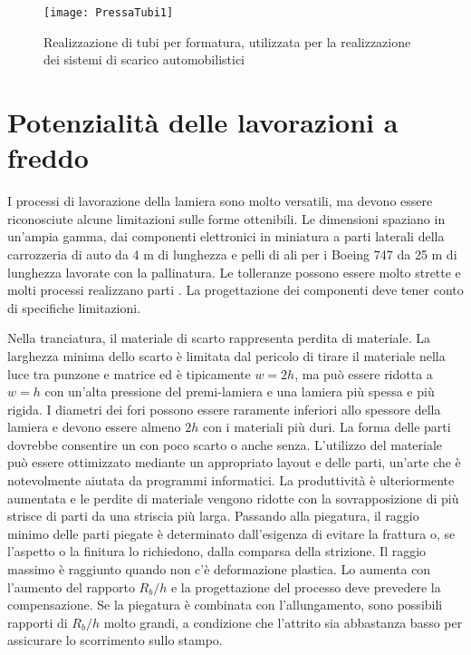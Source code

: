 \begin{figure}
\centering
\texttt{[image: PressaTubi1]}
\caption{Realizzazione di tubi per formatura, utilizzata per la realizzazione dei sistemi di scarico automobilistici}
\label{fig:PressaTubi1}
\end{figure}


\section{Potenzialità delle lavorazioni a freddo}
I processi di lavorazione della lamiera sono molto versatili, ma devono essere riconosciute alcune limitazioni sulle forme ottenibili.
Le dimensioni spaziano in un'ampia gamma, dai componenti elettronici in miniatura a parti laterali della carrozzeria di auto da 4 m di lunghezza e pelli di ali per i Boeing 747 da 25 m di lunghezza lavorate con la pallinatura.
Le tolleranze possono essere molto strette e molti processi realizzano parti .
La progettazione dei componenti deve tener conto di specifiche limitazioni.

Nella tranciatura, il materiale di scarto rappresenta perdita di materiale. La larghezza minima
dello scarto è limitata dal pericolo di tirare il materiale nella luce tra punzone e matrice ed è
tipicamente $w = 2h$, ma può essere ridotta a $w = h$ con un'alta pressione del premi-lamiera e
una lamiera più spessa e più rigida.
I diametri dei fori possono essere raramente inferiori allo spessore della lamiera e devono
essere almeno $2h$ con i materiali più duri. La forma delle parti dovrebbe consentire un
 con poco scarto o anche senza.
L'utilizzo del materiale può essere ottimizzato mediante un appropriato layout e  delle
parti, un'arte che è notevolmente aiutata da programmi informatici. La produttività è
ulteriormente aumentata e le perdite di materiale vengono ridotte con la sovrapposizione di
più strisce di parti da una striscia più larga.
Passando alla piegatura, il raggio minimo delle parti piegate è determinato dall'esigenza di
evitare la frattura o, se l'aspetto o la finitura lo richiedono, dalla comparsa della strizione.
Il raggio massimo è raggiunto quando non c'è deformazione plastica. Lo 
aumenta con l'aumento del rapporto $R_b/h$ e la progettazione del processo deve prevedere
la compensazione.
Se la piegatura è combinata con l'allungamento, sono possibili rapporti di $R_b/h$ molto grandi,
a condizione che l'attrito sia abbastanza basso per assicurare lo scorrimento sullo stampo.

